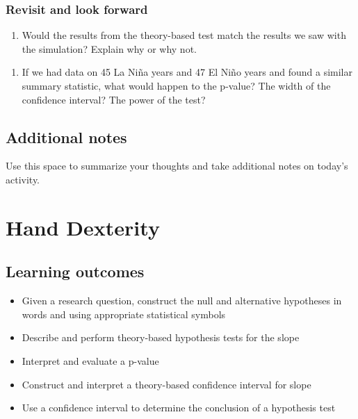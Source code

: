 \documentclass[
]{report}
\providecommand{\tightlist}{%
  \setlength{\itemsep}{0pt}\setlength{\parskip}{0pt}}
\begin{document}
\vspace{3in}

\hypertarget{revisit-and-look-forward}{%
\subsection*{Revisit and look forward}\label{revisit-and-look-forward}}

\begin{enumerate}
\def\labelenumi{\arabic{enumi}.}
\setcounter{enumi}{19}
\tightlist
\item
  Would the results from the theory-based test match the results we saw with the simulation? Explain why or why not.
\end{enumerate}

\vspace{1in}

\begin{enumerate}
\def\labelenumi{\arabic{enumi}.}
\setcounter{enumi}{20}
\tightlist
\item
  If we had data on 45 La Ni\~{n}a years and 47 El Ni\~{n}o years and found a similar summary statistic, what would happen to the p-value? The width of the confidence interval? The power of the test?
\end{enumerate}

\vspace{1in}

\hypertarget{additional-notes}{%
\section{Additional notes}\label{additional-notes}}

Use this space to summarize your thoughts and take additional notes on today's activity.

\hypertarget{hand-dexterity}{%
\chapter{Hand Dexterity}\label{hand-dexterity}}

\hypertarget{learning-outcomes}{%
\section{Learning outcomes}\label{learning-outcomes}}

\begin{itemize}
\item
  Given a research question, construct the null and alternative hypotheses
  in words and using appropriate statistical symbols
\item
  Describe and perform theory-based hypothesis tests for the slope
\item
  Interpret and evaluate a p-value
\item
  Construct and interpret a theory-based confidence interval for slope
\item
  Use a confidence interval to determine the conclusion of a hypothesis test
\end{itemize}
\end{document}
